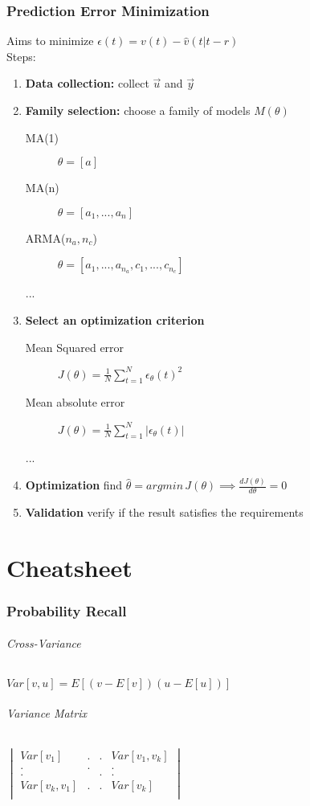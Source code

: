\documentclass{article}
\begin{document}
\section{Prediction Error Minimization} Aims to minimize $\epsilon(t)=v(t)-\hat{v}(t|t-r)$\\
Steps:
\begin{enumerate}
\item \textbf{Data collection:} collect $\vec{u}$ and $\vec{y}$
\item \textbf{Family selection:} choose a family of models $M(\theta)$
	\begin{description}
	\item[MA(1)] $\theta=[a]$
	\item[MA(n)] $\theta=[a_1,...,a_n]$
	\item[ARMA($n_a,n_c$)] $\theta=[a_1,...,a_{n_a},
	c_1,...,c_{n_c}]$
	\item[...]
	\end{description}
\item \textbf{Select an optimization criterion}
	\begin{description}
	\item[Mean Squared error] $J(\theta)=\frac{1}{N}\sum_{t=1}^N \epsilon_\theta(t)^2$
	\item[Mean absolute error] $J(\theta)=\frac{1}{N}\sum_{t=1}^N |\epsilon_\theta(t)|$
	\item[...]
	\end{description}
\item  \textbf{Optimization} find $\hat{\theta}=argmin\,J(\theta)\implies \frac{dJ(\theta)}{d\theta}=0$
\item \textbf{Validation} verify if the result satisfies the requirements
\end{enumerate}

\newpage
\appendix
\part{Cheatsheet}
\section{Probability Recall}
\paragraph{Cross-Variance}
$Var[v,u]=E[(v-E[v])(u-E[u])]$
\paragraph{Variance Matrix}
$\begin{vmatrix}
	Var[v_1]			&	.	&	.	&	Var[v_1,v_k]		\\
		.			&	.	&		&		.			\\
		.			&		&	.	&		.			\\
	Var[v_k,v_1]		&	.	&	.	&	Var[v_k]			\\
				
\end{vmatrix}$
\end{document}
